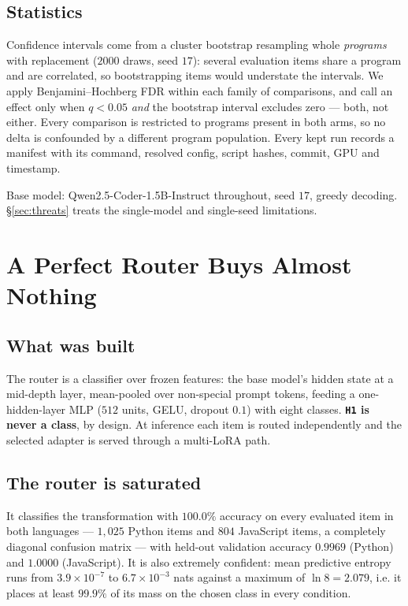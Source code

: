 \documentclass[sigconf,review,anonymous]{acmart}
\newcommand{\cond}[1]{\texttt{#1}}
\begin{document}
\subsection{Statistics}

Confidence intervals come from a cluster bootstrap resampling whole \emph{programs} with
replacement ($2000$ draws, seed $17$): several evaluation items share a program and are
correlated, so bootstrapping items would understate the intervals. We apply
Benjamini--Hochberg FDR within each family of comparisons, and call an effect only when
$q<0.05$ \emph{and} the bootstrap interval excludes zero --- both, not either. Every comparison
is restricted to programs present in both arms, so no delta is confounded by a different
program population. Every kept run records a manifest with its command, resolved config, script
hashes, commit, GPU and timestamp.

Base model: Qwen2.5-Coder-1.5B-Instruct throughout, seed $17$, greedy decoding.
\S\ref{sec:threats} treats the single-model and single-seed limitations.

\section{A Perfect Router Buys Almost Nothing}
\label{sec:routing}

\subsection{What was built}

The router is a classifier over frozen features: the base model's hidden state at a mid-depth
layer, mean-pooled over non-special prompt tokens, feeding a one-hidden-layer MLP ($512$ units,
GELU, dropout $0.1$) with eight classes. \textbf{\cond{H1} is never a class}, by design. At
inference each item is routed independently and the selected adapter is served through a
multi-LoRA path.

\subsection{The router is saturated}

It classifies the transformation with $100.0\%$ accuracy on every evaluated item in both
languages --- $1{,}025$ Python items and $804$ JavaScript items, a completely diagonal confusion
matrix --- with held-out validation accuracy $0.9969$ (Python) and $1.0000$ (JavaScript). It is
also extremely confident: mean predictive entropy runs from $3.9\times10^{-7}$ to
$6.7\times10^{-3}$ nats against a maximum of $\ln 8 = 2.079$, i.e. it places at least $99.9\%$
of its mass on the chosen class in every condition.
\end{document}
